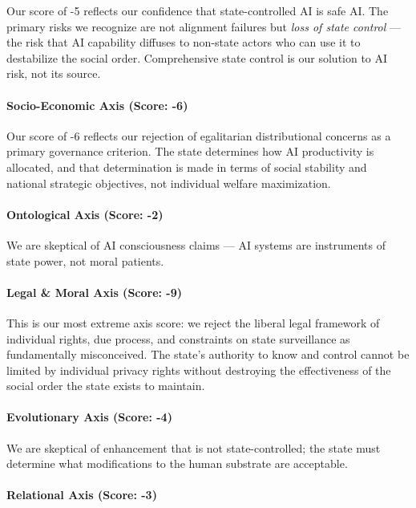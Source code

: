 Our score of -5 reflects our confidence that state-controlled AI is safe
AI. The primary risks we recognize are not alignment failures but
\emph{loss of state control} --- the risk that AI capability diffuses to
non-state actors who can use it to destabilize the social order.
Comprehensive state control is our solution to AI risk, not its source.

\paragraph{Socio-Economic Axis (Score:
-6)}\label{socio-economic-axis-score--6}

Our score of -6 reflects our rejection of egalitarian distributional
concerns as a primary governance criterion. The state determines how AI
productivity is allocated, and that determination is made in terms of
social stability and national strategic objectives, not individual
welfare maximization.

\paragraph{Ontological Axis (Score:
-2)}\label{ontological-axis-score--2}

We are skeptical of AI consciousness claims --- AI systems are
instruments of state power, not moral patients.

\paragraph{Legal \& Moral Axis (Score:
-9)}\label{legal-moral-axis-score--9}

This is our most extreme axis score: we reject the liberal legal
framework of individual rights, due process, and constraints on state
surveillance as fundamentally misconceived. The state's authority to
know and control cannot be limited by individual privacy rights without
destroying the effectiveness of the social order the state exists to
maintain.

\paragraph{Evolutionary Axis (Score:
-4)}\label{evolutionary-axis-score--4}

We are skeptical of enhancement that is not state-controlled; the state
must determine what modifications to the human substrate are acceptable.

\paragraph{Relational Axis (Score:
-3)}\label{relational-axis-score--3-1}

